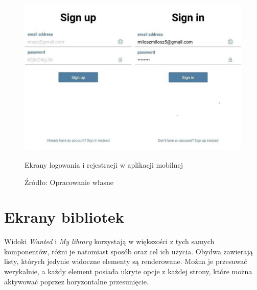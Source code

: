 \begin{figure}[H]
	\centering
	\includegraphics[width=\linewidth]{signin_signup.pdf}
	\caption{Ekrany logowania i rejestracji w aplikacji mobilnej}
	\caption*{Źródło: {Opracowanie własne}}
\end{figure}
\section{Ekrany bibliotek}
Widoki \textit{Wanted} i \textit{My library} korzystają w większości z tych samych komponentów, różni je natomiast sposób oraz cel ich użycia. Obydwa zawierają listy, których jedynie widoczne elementy są renderowane. Można je przesuwać werykalnie, a każdy element posiada ukryte opcje z każdej strony, które można aktywować poprzez horyzontalne przesunięcie.


